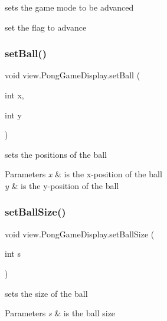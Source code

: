 sets the game mode to be advanced 

set the flag to advance \hypertarget{classview_1_1_pong_game_display_ac6afa3842b0a26be46dd0b7d202d887d}{}\label{classview_1_1_pong_game_display_ac6afa3842b0a26be46dd0b7d202d887d} 
\subsubsection{\texorpdfstring{set\+Ball()}{setBall()}}
{\footnotesize\ttfamily void view.\+Pong\+Game\+Display.\+set\+Ball (\begin{DoxyParamCaption}\item[{int}]{x,  }\item[{int}]{y }\end{DoxyParamCaption})}



sets the positions of the ball 


\begin{DoxyParams}{Parameters}
{\em x} & is the x-\/position of the ball \\
\hline
{\em y} & is the y-\/position of the ball \\
\hline
\end{DoxyParams}
\hypertarget{classview_1_1_pong_game_display_a295d4a14e718454eb223a5bb06141d53}{}\label{classview_1_1_pong_game_display_a295d4a14e718454eb223a5bb06141d53} 
\subsubsection{\texorpdfstring{set\+Ball\+Size()}{setBallSize()}}
{\footnotesize\ttfamily void view.\+Pong\+Game\+Display.\+set\+Ball\+Size (\begin{DoxyParamCaption}\item[{int}]{s }\end{DoxyParamCaption})}



sets the size of the ball 


\begin{DoxyParams}{Parameters}
{\em s} & is the ball size \\
\hline
\end{DoxyParams}
\hypertarget{classview_1_1_pong_game_display_aeaaff1c8033efd2d7f3242ab3b6c7e9e}{}\label{classview_1_1_pong_game_display_aeaaff1c8033efd2d7f3242ab3b6c7e9e} 
